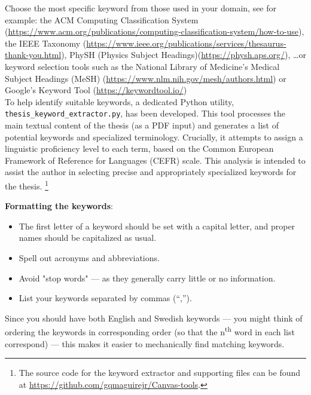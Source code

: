\documentclass[
English,                 %
includepublications,    %
%
%
%
%
%
%
%
%
%
%
%
%
%
%
%
%
%
%
]{kththesis}
\begin{document}
Choose the most specific keyword from those used in your domain, see for example: the ACM Computing Classification System ({\small \url{https://www.acm.org/publications/computing-classification-system/how-to-use})},
the IEEE Taxonomy ({\small \url{https://www.ieee.org/publications/services/thesaurus-thank-you.html}}), PhySH (Physics Subject Headings)\linebreak[4] ({\small \url{https://physh.aps.org/}}), \ldots or keyword selection tools such as the  National Library of Medicine's Medical Subject Headings (MeSH)  ({\small \url{https://www.nlm.nih.gov/mesh/authors.html}}) or Google's Keyword Tool ({\small \url{https://keywordtool.io/}})\\

To help identify suitable keywords, a dedicated Python utility, \texttt{thesis\_keyword\_extractor.py}, has been developed. This tool processes the main textual content of the thesis (as a \gls{PDF} input) and generates a list of potential keywords and specialized terminology. Crucially, it attempts to assign a linguistic proficiency level to each term, based on the Common European Framework of Reference for Languages (CEFR) scale. This analysis is intended to assist the author in selecting precise and appropriately specialized keywords for the thesis.
\footnote{The source code for the keyword extractor and supporting files can be found at \url{https://github.com/gqmaguirejr/Canvas-tools}.}

\textbf{Formatting the keywords}:
\begin{itemize}
  \item The first letter of a keyword should be set with a capital letter, and proper names should be capitalized as usual.
  \item Spell out acronyms and abbreviations.
  \item Avoid "stop words" --- as they generally carry little or no information.
  \item List your keywords separated by commas (\enquote{,}).
\end{itemize}    
Since you should have both English and Swedish keywords --- you might think of ordering the keywords in corresponding order (\ie so that the n\textsuperscript{th} word in each list correspond) --- this makes it easier to mechanically find matching keywords.
\end{document}
